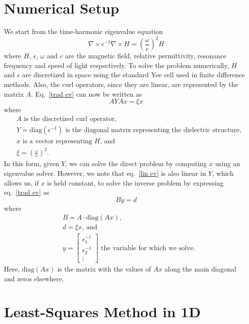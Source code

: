 \section{Numerical Setup}
We start from the time-harmonic eigenvalue equation 
\begin{equation}
\nabla \times \epsilon^{-1} \nabla \times H = \left(\frac{\omega}{c}\right)^2 H
\label{trad ev}\end{equation}
where $H$, $\epsilon$, $\omega$ and $c$ are the magnetic field, relative permittivity, resonance frequency and speed of light respectively. To solve the problem numerically, $H$ and $\epsilon$ are discretized in space using the standard Yee cell used in finite difference methods\cite{Yee66}. Also, the curl operators, since they are linear, are represented by the matrix $A$. Eq.~\eqref{trad ev} can now be written as 
\begin{equation}
A Y A x = \xi x
\label{lin ev}\end{equation}
where
\begin{align*}
&A \text{ is the discretized curl operator,} \\
&Y = \text{diag}(\epsilon^{-1}) \text{ is the diagonal matrix representing the dielectric structure,} \\
&x \text{ is a vector representing $H$, and} \\
&\xi =  \left(\frac{\omega}{c}\right)^2. 
\end{align*}
In this form, given $Y$, we can solve the direct problem by computing $x$ using an eigenvalue solver\cite{JJ99}. However, we note that eq.~\eqref{lin ev} is also linear in $Y$, which allows us, if $x$ is held constant, to solve the inverse problem by expressing eq.~\eqref{trad ev} as
\begin{equation}
By = d
\label{inv ls}\end{equation}
where
\begin{align*}
&B = A \cdot \text{diag}(Ax), \\
&d = \xi x\text{, and} \\
&y = 
\begin{bmatrix}
\epsilon_1^{-1} \\ \epsilon_2^{-1} \\ \vdots
\end{bmatrix} \text{ the variable for which we solve.}
\end{align*}
Here, $\text{diag}(Ax)$ is the matrix with the values of $Ax$ along the main diagonal and zeros elsewhere.

\section{Least-Squares Method in 1D}
